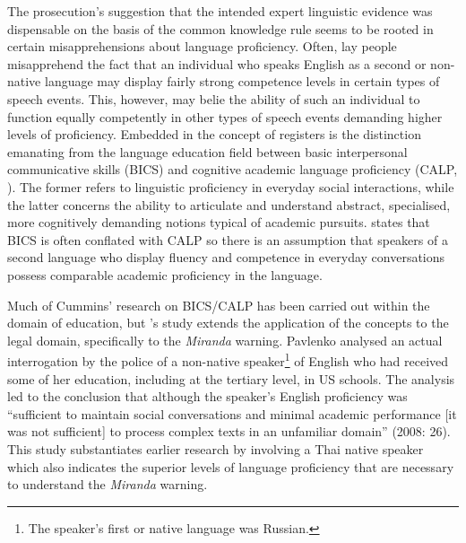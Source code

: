 \documentclass[output=paper,colorlinks,citecolor=brown]{langscibook}
\begin{document}
The prosecution’s suggestion that the intended expert linguistic evidence was dispensable on the basis of the common knowledge rule seems to be rooted in certain misapprehensions about language proficiency. Often, lay people misapprehend the fact that an individual who speaks English as a second or non-native language may display fairly strong competence levels in certain types of speech events. This, however, may belie the ability of such an individual to function equally competently in other types of speech events demanding higher levels of proficiency. Embedded in the concept of registers is the distinction emanating from the language education field between basic interpersonal communicative skills (BICS) and cognitive academic language proficiency (CALP, \citealt{Cummins1979}). The former refers to linguistic proficiency in everyday social interactions, while the latter concerns the ability to articulate and understand abstract, specialised, more cognitively demanding notions typical of academic pursuits. \citet{Cummins2008} states that BICS is often conflated with CALP so there is an assumption that speakers of a second language who display fluency and competence in everyday conversations possess comparable academic proficiency in the language.

Much of Cummins’ research on BICS/CALP has been carried out within the domain of education, but \citeauthor{Pavlenko2008}'s \citeyear{Pavlenko2008} study extends the application of the concepts to the legal domain, specifically to the \emph{Miranda} warning. Pavlenko analysed an actual interrogation by the police of a non-native speaker\footnote{The speaker’s first or native language was Russian.} of English who had received some of her education, including at the tertiary level, in US schools. The analysis led to the conclusion that although the speaker’s English proficiency was “sufficient to maintain social conversations and minimal academic performance [it was not sufficient] to process complex texts in an unfamiliar domain” (2008: 26). This study substantiates earlier research by \citet{Brière1978}  involving a Thai native speaker which also indicates the superior levels of language proficiency that are necessary to understand the \emph{Miranda} warning. 
\end{document}
